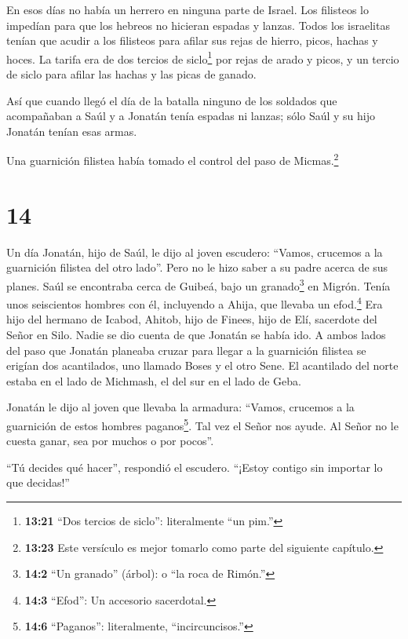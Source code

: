  En esos días no había un herrero en ninguna parte de
Israel. Los filisteos lo impedían para que los hebreos no hicieran
espadas y lanzas.  Todos los israelitas tenían que acudir a
los filisteos para afilar sus rejas de hierro, picos, hachas y hoces.
 La tarifa era de dos tercios de siclo\footnote{\textbf{13:21}
  ``Dos tercios de siclo'': literalmente ``un pim.''} por rejas de arado
y picos, y un tercio de siclo para afilar las hachas y las picas de
ganado.

 Así que cuando llegó el día de la batalla ninguno de los
soldados que acompañaban a Saúl y a Jonatán tenía espadas ni lanzas;
sólo Saúl y su hijo Jonatán tenían esas armas.

 Una guarnición filistea había tomado el control del paso
de Micmas.\footnote{\textbf{13:23} Este versículo es mejor tomarlo como
  parte del siguiente capítulo.}

\hypertarget{section-13}{%
\section{14}\label{section-13}}

 Un día Jonatán, hijo de Saúl, le dijo al joven escudero:
``Vamos, crucemos a la guarnición filistea del otro lado''. Pero no le
hizo saber a su padre acerca de sus planes.  Saúl se
encontraba cerca de Guibeá, bajo un granado\footnote{\textbf{14:2} ``Un
  granado'' (árbol): o ``la roca de Rimón.''} en Migrón. Tenía unos
seiscientos hombres con él,  incluyendo a Ahija, que llevaba
un efod.\footnote{\textbf{14:3} ``Efod'': Un accesorio sacerdotal.} Era
hijo del hermano de Icabod, Ahitob, hijo de Finees, hijo de Elí,
sacerdote del Señor en Silo. Nadie se dio cuenta de que Jonatán se había
ido.  A ambos lados del paso que Jonatán planeaba cruzar
para llegar a la guarnición filistea se erigían dos acantilados, uno
llamado Boses y el otro Sene.  El acantilado del norte
estaba en el lado de Michmash, el del sur en el lado de Geba.

 Jonatán le dijo al joven que llevaba la armadura: ``Vamos,
crucemos a la guarnición de estos hombres paganos\footnote{\textbf{14:6}
  ``Paganos'': literalmente, ``incircuncisos.''}. Tal vez el Señor nos
ayude. Al Señor no le cuesta ganar, sea por muchos o por pocos''.

 ``Tú decides qué hacer'', respondió el escudero. ``¡Estoy
contigo sin importar lo que decidas!''

